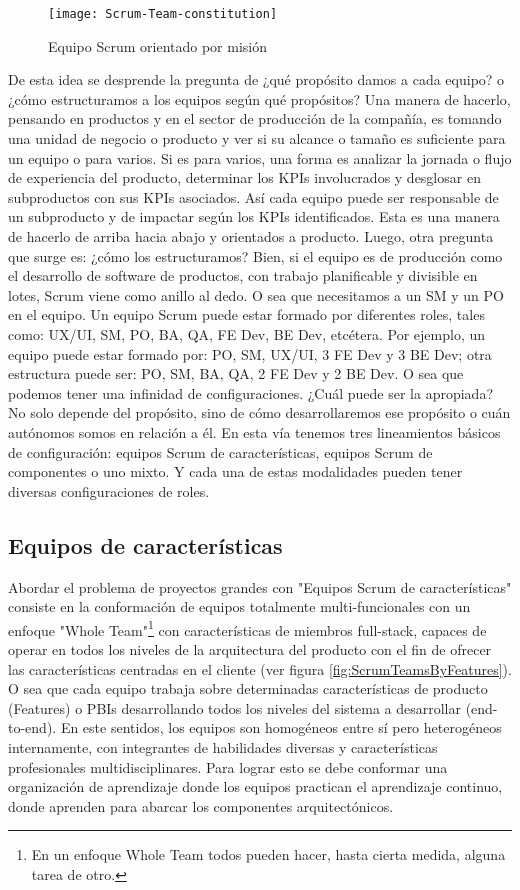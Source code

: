 \begin{figure}[h]
  \centering
  \texttt{[image: Scrum-Team-constitution]}
  \caption{Equipo Scrum orientado por misión}
  \centering
  \label{fig:Scrum-Team-constitution} %
\end{figure}

De esta idea se desprende la pregunta de ¿qué propósito damos a cada equipo? o ¿cómo estructuramos a los equipos según qué propósitos? Una manera de hacerlo, pensando en productos y en el sector de producción de la compañía, es tomando una unidad de negocio o producto y ver si su alcance o tamaño es suficiente para un equipo o para varios. Si es para varios, una forma es analizar la jornada o flujo de experiencia del producto, determinar los KPIs involucrados y desglosar en subproductos con sus KPIs asociados. Así cada equipo puede ser responsable de un subproducto y de impactar según los KPIs identificados. Esta es una manera de hacerlo de arriba hacia abajo y orientados a producto. Luego, otra pregunta que surge es: ¿cómo los estructuramos? Bien, si el equipo es de producción como el desarrollo de software de productos, con trabajo planificable y divisible en lotes, Scrum viene como anillo al dedo. O sea que necesitamos a un SM y un PO en el equipo. Un equipo Scrum puede estar formado por diferentes roles, tales como: UX/UI, SM, PO, BA, QA, FE Dev, BE Dev, etcétera. Por ejemplo, un equipo puede estar formado por: PO, SM, UX/UI, 3 FE Dev y 3 BE Dev; otra estructura puede ser: PO, SM, BA, QA, 2 FE Dev y 2 BE Dev. O sea que podemos tener una infinidad de configuraciones. ¿Cuál puede ser la apropiada? No solo depende del propósito, sino de cómo desarrollaremos ese propósito o cuán autónomos somos en relación a él. En esta vía tenemos tres lineamientos básicos de configuración: equipos Scrum de características, equipos Scrum de componentes o uno mixto. Y cada una de estas modalidades pueden tener diversas configuraciones de roles.

\subsection{Equipos de características}

Abordar el problema de proyectos grandes con "Equipos Scrum de características" consiste en la conformación de equipos totalmente multi-funcionales con un enfoque "Whole Team"\footnote{En un enfoque Whole Team todos pueden hacer, hasta cierta medida, alguna tarea de otro\cite{Juan-Gabardini-2015}.} con características de miembros full-stack, capaces de operar en todos los niveles de la arquitectura del producto con el fin de ofrecer las características centradas en el cliente (ver figura \ref{fig:ScrumTeamsByFeatures}). O sea que cada equipo trabaja sobre determinadas características de producto (Features) o PBIs desarrollando todos los niveles del sistema a desarrollar (end-to-end). En este sentidos, los equipos son homogéneos entre sí pero heterogéneos internamente, con integrantes de habilidades diversas y características profesionales multidisciplinares. Para lograr esto se debe conformar una organización de aprendizaje donde los equipos practican el aprendizaje continuo, donde aprenden para abarcar los componentes arquitectónicos.

